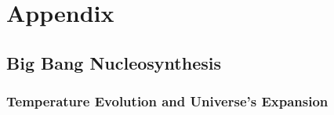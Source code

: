 \chapter*{Appendix}\label{chap:app}
\setcounter{section}{0}
\setcounter{figure}{0}
\renewcommand{\thesection}{\Alph{section}}
\renewcommand{\thesubsection}{\Alph{section}.\arabic{subsection}}
\renewcommand{\thefigure}{\Alph{section}.\arabic{figure}}

\vspace{-0.5cm}

\section{Big Bang Nucleosynthesis}

\subsection{Temperature Evolution and Universe's Expansion}\label{sec:evo}

